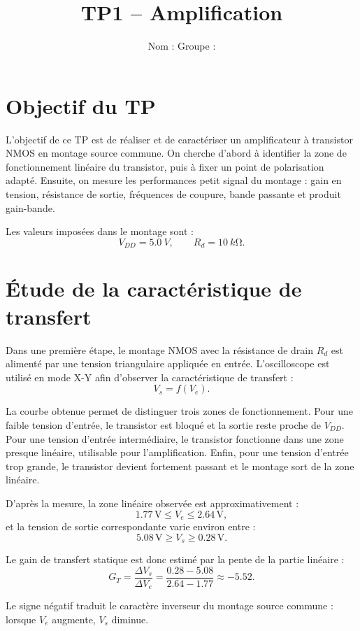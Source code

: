 \documentclass[11pt,a4paper]{article}
\title{TP1 -- Amplification}
\author{Nom : \underline{\hspace{5cm}} \qquad Groupe : \underline{\hspace{3cm}}}
\date{}
\begin{document}
\maketitle

\section{Objectif du TP}

L'objectif de ce TP est de réaliser et de caractériser un amplificateur à transistor NMOS en montage source commune. On cherche d'abord à identifier la zone de fonctionnement linéaire du transistor, puis à fixer un point de polarisation adapté. Ensuite, on mesure les performances petit signal du montage : gain en tension, résistance de sortie, fréquences de coupure, bande passante et produit gain-bande.

Les valeurs imposées dans le montage sont :
\[
V_{DD}=\SI{5.0}{V}, \qquad R_d=\SI{10}{k\ohm}.
\]

\section{Étude de la caractéristique de transfert}

Dans une première étape, le montage NMOS avec la résistance de drain $R_d$ est alimenté par une tension triangulaire appliquée en entrée. L'oscilloscope est utilisé en mode X-Y afin d'observer la caractéristique de transfert :
\[
V_s=f(V_e).
\]

La courbe obtenue permet de distinguer trois zones de fonctionnement. Pour une faible tension d'entrée, le transistor est bloqué et la sortie reste proche de $V_{DD}$. Pour une tension d'entrée intermédiaire, le transistor fonctionne dans une zone presque linéaire, utilisable pour l'amplification. Enfin, pour une tension d'entrée trop grande, le transistor devient fortement passant et le montage sort de la zone linéaire.

D'après la mesure, la zone linéaire observée est approximativement :
\[
1.77\,\mathrm{V} \leq V_e \leq 2.64\,\mathrm{V},
\]
et la tension de sortie correspondante varie environ entre :
\[
5.08\,\mathrm{V} \geq V_s \geq 0.28\,\mathrm{V}.
\]

Le gain de transfert statique est donc estimé par la pente de la partie linéaire :
\[
G_T=\frac{\Delta V_s}{\Delta V_e}
=\frac{0.28-5.08}{2.64-1.77}
\approx -5.52.
\]

Le signe négatif traduit le caractère inverseur du montage source commune : lorsque $V_e$ augmente, $V_s$ diminue.
\end{document}
